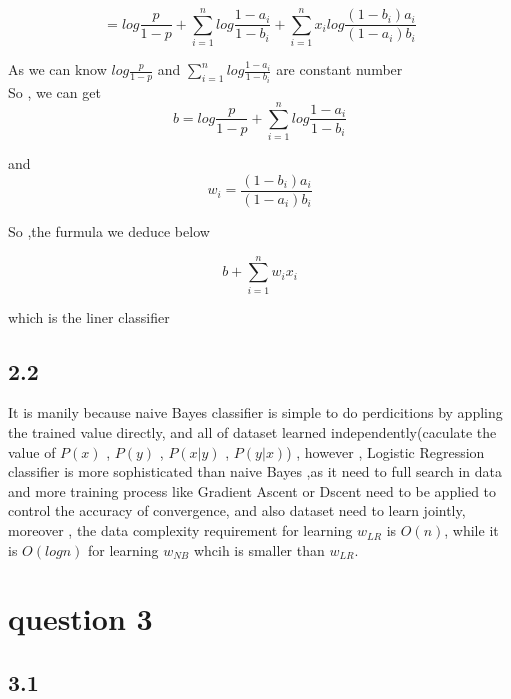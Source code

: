\documentclass[a4paper,12pt]{article}
\begin{document}
$$=log\frac{p}{1-p}+\sum\limits_{i=1}^nlog\frac{1-a_i}{1-b_i} + \sum\limits_{i=1}^nx_ilog\frac{(1-b_i)a_i}{(1-a_i)b_i} $$

As we can know $log\frac{p}{1-p}$ and $\sum\limits_{i=1}^nlog\frac{1-a_i}{1-b_i}$ are constant number\\

So , we can get 
$$b = log\frac{p}{1-p} + \sum\limits_{i=1}^nlog\frac{1-a_i}{1-b_i} $$

and
$$w_i = \frac{(1-b_i)a_i}{(1-a_i)b_i} $$

So ,the furmula we deduce below 

$$b + \sum\limits_{i=1}^n w_i x_i $$

which is the liner classifier\\


\newpage
\subsection*{2.2}
It is manily because naive Bayes classifier is simple to do perdicitions by appling the trained value directly, and all of dataset learned independently(caculate the value of $P(x)$ , $P(y)$  , $P(x|y)$ , $ P(y|x)$) , however , Logistic Regression classifier is more sophisticated than naive Bayes ,as it need to full search in data and more training process like Gradient Ascent or Dscent need to be applied to control the accuracy of convergence, and also dataset need to learn jointly, moreover , the data complexity requirement for learning $w_{LR}$ is $O(n)$, while it is $O(log⁡n)$ for learning $w_{NB}$ whcih is smaller than $w_{LR}$.


\section*{question 3}
\subsection*{3.1}
\end{document}
